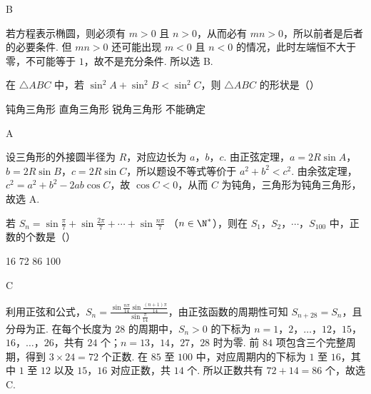 \begin{answer}
B
\end{answer}

\begin{solution}
若方程表示椭圆，则必须有 \(m>0\) 且 \(n>0\)，从而必有 \(mn>0\)，所以前者是后者的必要条件. 但 \(mn>0\) 还可能出现 \(m<0\) 且 \(n<0\) 的情况，此时左端恒不大于零，不可能等于 \(1\)，故不是充分条件. 所以选 B.
\end{solution}

\begin{problem}
在 \(\triangle ABC\) 中，若 \(\sin^{2} A + \sin^{2} B < \sin^{2} C\)，则 \(\triangle ABC\) 的形状是（\quad）

\choices
    {钝角三角形}
    {直角三角形}
    {锐角三角形}
    {不能确定}
\end{problem}

\begin{answer}
A
\end{answer}

\begin{solution}
设三角形的外接圆半径为 \(R\)，对应边长为 \(a\)，\(b\)，\(c\). 由正弦定理，\(a=2R\sin A\)，\(b=2R\sin B\)，\(c=2R\sin C\)，所以题设不等式等价于 \(a^2+b^2<c^2\). 由余弦定理，\(c^2=a^2+b^2-2ab\cos C\)，故 \(\cos C<0\)，从而 \(C\) 为钝角，三角形为钝角三角形，故选 A.
\end{solution}

\begin{problem}
若 \(S_{n} = \sin \frac{\pi}{7} + \sin \frac{2\pi}{7} + \cdots + \sin \frac{n\pi}{7}\) （\(n \in \N^{*}\)），则在 \(S_{1}\)，\(S_{2}\)，\(\cdots\)，\(S_{100}\) 中，正数的个数是（\quad）

\choices
    {16}
    {72}
    {86}
    {100}
\end{problem}

\begin{answer}
C
\end{answer}

\begin{solution}
利用正弦和公式，\(S_n=\frac{\sin\frac{n\pi}{14}\sin\frac{(n+1)\pi}{14}}{\sin\frac{\pi}{14}}\)，由正弦函数的周期性可知 \(S_{n+28}=S_n\)，且分母为正. 在每个长度为 \(28\) 的周期中，\(S_n>0\) 的下标为 \(n=1\)，\(2\)，\(\ldots\)，\(12\)，\(15\)，\(16\)，\(\ldots\)，\(26\)，共有 \(24\) 个；\(n=13\)，\(14\)，\(27\)，\(28\) 时为零. 前 \(84\) 项包含三个完整周期，得到 \(3\times24=72\) 个正数. 在 \(85\) 至 \(100\) 中，对应周期内的下标为 \(1\) 至 \(16\)，其中 \(1\) 至 \(12\) 以及 \(15\)，\(16\) 对应正数，共 \(14\) 个. 所以正数共有 \(72+14=86\) 个，故选 C.
\end{solution}

